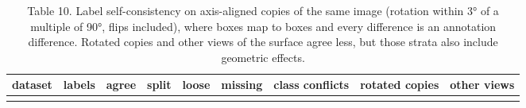 \documentclass[
  10pt,
]{article}
\begin{document}
\begin{longtable}[]{@{}
  >{\raggedright\arraybackslash}p{}
  >{\raggedright\arraybackslash}p{}
  >{\raggedright\arraybackslash}p{}
  >{\raggedright\arraybackslash}p{}
  >{\raggedright\arraybackslash}p{}
  >{\raggedright\arraybackslash}p{}
  >{\raggedright\arraybackslash}p{}
  >{\raggedright\arraybackslash}p{}
  >{\raggedright\arraybackslash}p{}@{}}
\caption{Table 10. Label self-consistency on axis-aligned copies of the
same image (rotation within 3° of a multiple of 90°, flips included),
where boxes map to boxes and every difference is an annotation
difference. Rotated copies and other views of the surface agree less,
but those strata also include geometric effects.}\tabularnewline
\toprule\noalign{}
\begin{minipage}[b]{\linewidth}\raggedright
dataset
\end{minipage} & \begin{minipage}[b]{\linewidth}\raggedright
labels
\end{minipage} & \begin{minipage}[b]{\linewidth}\raggedright
agree
\end{minipage} & \begin{minipage}[b]{\linewidth}\raggedright
split
\end{minipage} & \begin{minipage}[b]{\linewidth}\raggedright
loose
\end{minipage} & \begin{minipage}[b]{\linewidth}\raggedright
missing
\end{minipage} & \begin{minipage}[b]{\linewidth}\raggedright
class conflicts
\end{minipage} & \begin{minipage}[b]{\linewidth}\raggedright
rotated copies
\end{minipage} & \begin{minipage}[b]{\linewidth}\raggedright
other views
\end{minipage} \\
\midrule\noalign{}
\endfirsthead
\toprule\noalign{}
\begin{minipage}[b]{\linewidth}\raggedright

\end{minipage}
\end{longtable}
\end{document}
